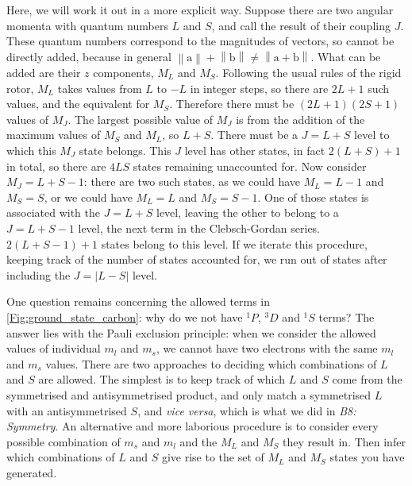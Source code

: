 \documentclass{article}
\theoremstyle{plain}\theoremheaderfont{\normalfont\itshape}\theorembodyfont{\rmfamily}\theoremseparator{.}\newtheorem*{rem}{Remark}\newtheorem*{ex}{Example}\newtheorem*{proof}{Proof}\newtheorem*{altp}{Alternative proof}
\theoremstyle{plain}\theoremheaderfont{\normalfont\bfseries}\theorembodyfont{\rmfamily}\theoremseparator{.}\newtheorem{thm}{Theorem}[section]\newtheorem{lem}[thm]{Lemma}\newtheorem{prop}[thm]{Proposition}\newtheorem*{cor}{Corollary}\newtheorem{defn}[thm]{Definition}\newtheorem{clm}[thm]{Claim}\newtheorem{clminproof}{Claim}
\theoremstyle{break}\theoremheaderfont{\normalfont\itshape}\theorembodyfont{\rmfamily}\theoremseparator{.\medskip}\newtheorem*{proofskip}{Proof}\newtheorem*{exs}{Examples}\newtheorem*{rems}{Remarks}
\theoremstyle{break}\theoremheaderfont{\normalfont\bfseries}\theorembodyfont{\rmfamily}\theoremseparator{.\medskip}\newtheorem{lemskip}[thm]{Lemma}\newtheorem{defnskip}[thm]{Definition}\newtheorem{propskip}[thm]{Proposition}\newtheorem{thmskip}[thm]{Theorem}
\numberwithin{equation}{section}
\newcommand{\vb}[1]{\bm{\mathrm{#1}}}
\newcommand{\abs}[1]{\left| #1 \right|}
\newcommand{\norm}[1]{\left\| #1 \right\|}
\begin{document}
    Here, we will work it out in a more explicit way. Suppose there are two angular momenta with quantum numbers \(L\) and \(S\), and call the result of their coupling \(J\). These quantum numbers correspond to the magnitudes of vectors, so cannot be directly added, because in general \(\norm{\vb{a}}+\norm{\vb{b}}\ne \norm{\vb{a}+\vb{b}}\). What can be added are their \(z\) components, \(M_L\) and \(M_S\). Following the usual rules of the rigid rotor, \(M_L\) takes values from \(L\) to \(-L\) in integer steps, so there are \(2L+1\) such values, and the equivalent for \(M_S\). Therefore there must be \((2L+1)(2S+1)\) values of \(M_J\). The largest possible value of \(M_J\) is from the addition of the maximum values of \(M_S\) and \(M_L\), so \(L+S\). There must be a \(J=L+S\) level to which this \(M_J\) state belongs. This \(J\) level has other states, in fact \(2(L+S)+1\) in total, so there are \(4LS\) states remaining unaccounted for. Now consider \(M_J=L+S-1\): there are two such states, as we could have \(M_L=L-1\) and \(M_S=S\), or we could have \(M_L=L\) and \(M_S=S-1\). One of those states is associated with the \(J=L+S\) level, leaving the other to belong to a \(J=L+S-1\) level, the next term in the Clebsch-Gordan series. \(2(L+S-1)+1\) states belong to this level. If we iterate this procedure, keeping track of the number of states accounted for, we run out of states after including the \(J=\abs{L-S}\) level.

    One question remains concerning the allowed terms in \cref{Fig:ground_state_carbon}: why do we not have \(^1P\), \(^3D\) and \(^1S\) terms? The answer lies with the Pauli exclusion principle: when we consider the allowed values of individual \(m_l\) and \(m_s\), we cannot have two electrons with the same \(m_l\) and \(m_s\) values. There are two approaches to deciding which combinations of \(L\) and \(S\) are allowed. The simplest is to keep track of which \(L\) and \(S\) come from the symmetrised and antisymmetrised product, and only match a symmetrised \(L\) with an antisymmetrised \(S\), and \textit{vice versa}, which is what we did in \textit{B8: Symmetry}. An alternative and more laborious procedure is to consider every possible combination of \(m_s\) and \(m_l\) and the \(M_L\) and \(M_S\) they result in. Then infer which combinations of \(L\) and \(S\) give rise to the set of \(M_L\) and \(M_S\) states you have generated.
\end{document}
